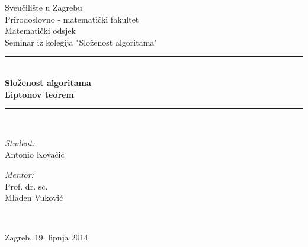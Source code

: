 \documentclass[12pt, a4paper]{book}
\newcommand{\HRule}{\rule{\linewidth}{0.5mm}}
\begin{document}
\renewcommand{\bibname}{Literatura}%
\begin{titlepage}
\begin{center}
\newtheorem{thm}{Teorem}[chapter] %
\newtheorem{defn}[thm]{Definicija} %
\newtheorem{exa}[thm]{Primjer} %
\newtheorem{nap}[thm]{Napomena} %
\newtheorem{conj}[thm]{Slutnja} %

\LARGE Sveučilište u Zagrebu \\[1cm] Prirodoslovno - matematički fakultet \\[1cm] Matematički odsjek\\[3cm]

\Large Seminar iz kolegija "Složenost algoritama" \\[0.5cm]

\HRule \\[0.4cm]
{ \huge \bfseries Složenost algoritama \\ Liptonov teorem}\\[0.4cm]

\HRule \\[4.4cm]

\begin{minipage}{0.4\textwidth}
\begin{flushleft} \large
\emph{Student:\\}
Antonio Kovačić
\end{flushleft}
\end{minipage}
\begin{minipage}{0.4\textwidth}
\begin{flushright} \large
\emph{Mentor:\\}
Prof. dr. sc.\\ Mladen Vuković
\end{flushright}
\end{minipage}
\\[1cm]

\vfill 

{\large Zagreb, 19. lipnja 2014.}

\end{center}
\end{titlepage}

\pagestyle{plain} %
\setcounter{page}{1}
\begingroup
\let\cleardoublepage\relax
\tableofcontents
\end{document}
